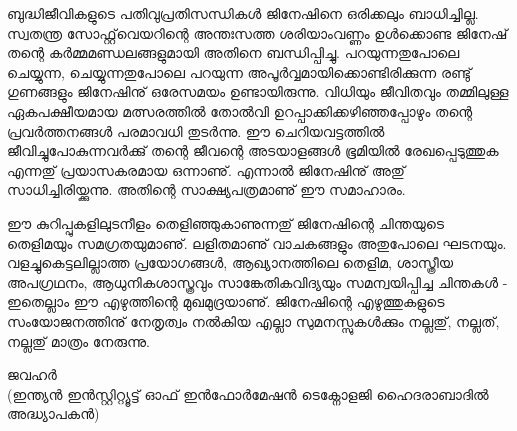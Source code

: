 ബുദ്ധിജീവികളുടെ പതിവുപ്രതിസന്ധികള്‍ ജിനേഷിനെ ഒരിക്കലും ബാധിച്ചില്ല. സ്വതന്ത്ര സോഫ്റ്റ്‌വെയറിന്റെ അന്തഃസത്ത ശരിയാംവണ്ണം 
ഉള്‍ക്കൊണ്ട ജിനേഷ് തന്റെ കര്‍മ്മമണ്ഡലങ്ങളുമായി അതിനെ ബന്ധിപ്പിച്ചു. പറയുന്നതുപോലെ ചെയ്യുന്ന, ചെയ്യുന്നതുപോലെ പറയുന്ന 
 അപൂര്‍വ്വമായിക്കൊണ്ടിരിക്കുന്ന രണ്ടു് ഗുണങ്ങളും ജിനേഷിനു് ഒരേസമയം ഉണ്ടായിരുന്നു. വിധിയും ജീവിതവും തമ്മിലുള്ള 
ഏകപക്ഷീയമായ മത്സരത്തില്‍ തോല്‍വി ഉറപ്പാക്കിക്കഴിഞ്ഞപ്പോഴും തന്റെ പ്രവര്‍ത്തനങ്ങള്‍ പരമാവധി തുടര്‍ന്നു.  ഈ ചെറിയവട്ടത്തില്‍ 
ജീവിച്ചുപോകുന്നവര്‍ക്കു് തന്റെ ജീവന്റെ അടയാളങ്ങള്‍ ഭൂമിയില്‍ രേഖപ്പെടുത്തുക എന്നതു് പ്രയാസകരമായ ഒന്നാണു്. എന്നാല്‍ ജിനേഷിനു് 
അതു് സാധിച്ചിരിയ്ക്കുന്നു. അതിന്റെ സാക്ഷ്യപത്രമാണു് ഈ സമാഹാരം.

ഈ കുറിപ്പുകളിലുടനീളം തെളിഞ്ഞുകാണുന്നതു് ജിനേഷിന്റെ ചിന്തയുടെ തെളിമയും സമഗ്രതയുമാണു്. ലളിതമാണു് വാചകങ്ങളും അതുപോലെ ഘടനയും. 
വളച്ചുകെട്ടലില്ലാത്ത പ്രയോഗങ്ങള്‍, ആഖ്യാനത്തിലെ തെളിമ, ശാസ്ത്രീയ അപഗ്രഥനം, ആധുനികശാസ്ത്രവും സാങ്കേതികവിദ്യയും സമന്വയിപ്പിച്ച 
ചിന്തകള്‍ - ഇതെല്ലാം ഈ എഴുത്തിന്റെ മുഖമുദ്രയാണു്. ജിനേഷിന്റെ എഴുത്തുകളുടെ സംയോജനത്തിനു് നേതൃത്വം നല്‍കിയ എല്ലാ സുമനസ്സുകള്‍ക്കും 
നല്ലതു്, നല്ലത്, നല്ലതു് മാത്രം നേരുന്നു. 

\begin{flushright}ജവഹര്‍ \\(ഇന്ത്യന്‍ ഇന്‍സ്റ്റിറ്റ്യൂട്ട് ഓഫ് ഇന്‍ഫോര്‍മേഷന്‍ ടെക്നോളജി ഹൈദരാബാദില്‍ അദ്ധ്യാപകന്‍) \end{flushright}
\newpage
